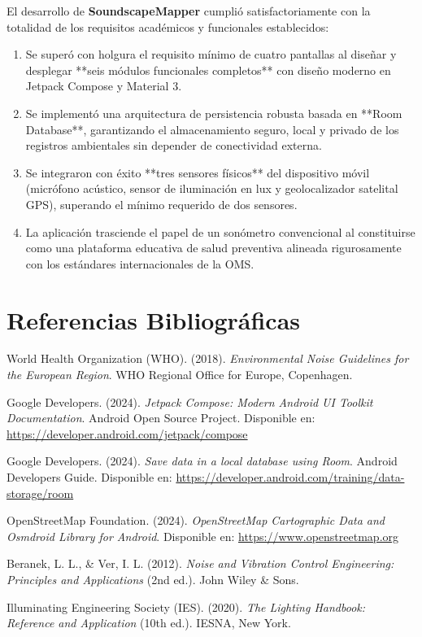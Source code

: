 \documentclass[12pt,a4paper]{article}
\begin{document}
El desarrollo de \textbf{SoundscapeMapper} cumplió satisfactoriamente con la totalidad de los requisitos académicos y funcionales establecidos:
\begin{enumerate}[label=\textbf{\arabic*.}]
    \item Se superó con holgura el requisito mínimo de cuatro pantallas al diseñar y desplegar **seis módulos funcionales completos** con diseño moderno en Jetpack Compose y Material 3.
    \item Se implementó una arquitectura de persistencia robusta basada en **Room Database**, garantizando el almacenamiento seguro, local y privado de los registros ambientales sin depender de conectividad externa.
    \item Se integraron con éxito **tres sensores físicos** del dispositivo móvil (micrófono acústico, sensor de iluminación en lux y geolocalizador satelital GPS), superando el mínimo requerido de dos sensores.
    \item La aplicación trasciende el papel de un sonómetro convencional al constituirse como una plataforma educativa de salud preventiva alineada rigurosamente con los estándares internacionales de la OMS.
\end{enumerate}

\section{Referencias Bibliográficas}

\begin{enumerate}[label={[\arabic*]}]
    \item World Health Organization (WHO). (2018). \textit{Environmental Noise Guidelines for the European Region}. WHO Regional Office for Europe, Copenhagen.
    \item Google Developers. (2024). \textit{Jetpack Compose: Modern Android UI Toolkit Documentation}. Android Open Source Project. Disponible en: \url{https://developer.android.com/jetpack/compose}
    \item Google Developers. (2024). \textit{Save data in a local database using Room}. Android Developers Guide. Disponible en: \url{https://developer.android.com/training/data-storage/room}
    \item OpenStreetMap Foundation. (2024). \textit{OpenStreetMap Cartographic Data and Osmdroid Library for Android}. Disponible en: \url{https://www.openstreetmap.org}
    \item Beranek, L. L., \& Ver, I. L. (2012). \textit{Noise and Vibration Control Engineering: Principles and Applications} (2nd ed.). John Wiley \& Sons.
    \item Illuminating Engineering Society (IES). (2020). \textit{The Lighting Handbook: Reference and Application} (10th ed.). IESNA, New York.
\end{enumerate}
\end{document}
